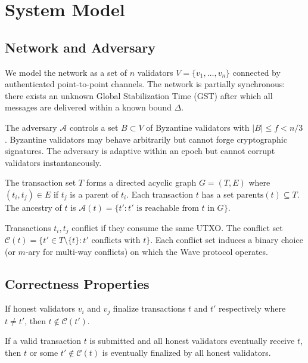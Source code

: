 \section{System Model}

\label{sec:model}

\subsection{Network and Adversary}

We model the network as a set of $n$ validators $V = \{v_1, \ldots, v_n\}$ connected
by authenticated point-to-point channels. The network is partially synchronous: there
exists an unknown Global Stabilization Time (GST) after which all messages are delivered
within a known bound $\Delta$.

\begin{definition}
The adversary $\mathcal{A}$ controls a set $B \subset V$ of Byzantine validators with
$|B| \leq f < n/3$. Byzantine validators may behave arbitrarily but cannot forge
cryptographic signatures. The adversary is adaptive within an epoch but cannot corrupt
validators instantaneously.
\end{definition}

\begin{definition}
\label{def:dag}
The transaction set $T$ forms a directed acyclic graph $G = (T, E)$ where $(t_i, t_j) \in E$
if $t_j$ is a parent of $t_i$. Each transaction $t$ has a set $\text{parents}(t) \subseteq T$.
The ancestry of $t$ is $\mathcal{A}(t) = \{t' : t' \text{ is reachable from } t \text{ in } G\}$.
\end{definition}

\begin{definition}
Transactions $t_i, t_j$ conflict if they consume the same UTXO. The conflict set
$\mathcal{C}(t) = \{t' \in T \setminus \{t\} : t' \text{ conflicts with } t\}$.
Each conflict set induces a binary choice (or $m$-ary for multi-way conflicts) on which
the Wave protocol operates.
\end{definition}

\subsection{Correctness Properties}

\begin{definition}[Safety]
If honest validators $v_i$ and $v_j$ finalize transactions $t$ and $t'$ respectively
where $t \neq t'$, then $t \notin \mathcal{C}(t')$.
\end{definition}

\begin{definition}[Liveness]
If a valid transaction $t$ is submitted and all honest validators eventually receive $t$,
then $t$ or some $t' \notin \mathcal{C}(t)$ is eventually finalized by all honest validators.
\end{definition}

